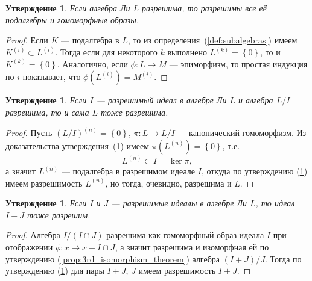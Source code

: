 \documentclass[a4paper, 12pt]{article}
\newtheorem{proposition}[theorem]{Утверждение}
\theoremstyle{definition}
\begin{document}
\begin{proposition}
    \label{prop:subalgebras_and_homorphisms_solvability}
    Если алгебра Ли \({ L }\) разрешима, то разрешимы все её подалгебры и гомоморфные образы.
\end{proposition}
\begin{proof}
    Если \({ K }\) --- подалгебра в \({ L }\), то из определения~(\ref{def:subalgebras}) имеем \({ K^{(i)} \subset L^{(i)} }\). Тогда если для некоторого \({ k }\) выполнено \({ L^{(k)} = \left\{ 0 \right\} }\), то и \({ K^{(k)} = \left\{ 0 \right\} }\). Аналогично, если \({ \phi : L \to  M }\) --- эпиморфизм, то простая индукция по \({ i }\) показывает, что \({ \phi(L^{(i)}) = M^{(i)}. }\)
\end{proof}

\begin{proposition}
    \label{prop:L/I_solvability}
    Если \({ I }\) --- разрешимый идеал в алгебре Ли \({ L }\) и алгебра \({ L / I }\) разрешима, то и сама \({ L }\) тоже разрешима.
\end{proposition}
\begin{proof}
    Пусть \({ (L / I)^{(n)} = \left\{ 0 \right\} }\), \({ \pi : L \to L / I }\) --- канонический гомоморфизм. Из доказательства утверждения~(\ref{prop:subalgebras_and_homorphisms_solvability}) имеем \({ \pi(L^{(n)}) = \left\{ 0 \right\} }\), т.е.
    \[
        L^{(n)} \subset I = \ker \pi,
    \]
    а значит \({ L^{(n)} }\) --- подалгебра в разрешимом идеале \({ I }\), откуда по утверждению (\ref{prop:subalgebras_and_homorphisms_solvability}) имеем разрешимость \({ L^{(n)} }\), но тогда, очевидно, разрешима и \({ L }\).
\end{proof}

\begin{proposition}
    Если \({ I }\) и \({ J }\) --- разрешимые идеалы в алгебре Ли \({ L }\), то идеал \({ I + J }\) тоже разрешим.
\end{proposition}
\begin{proof}
    Алгебра \({ I / (I \cap J) }\) разрешима как гомоморфный образ идеала \({ I }\) при отображении \({ \phi : x \mapsto x + I \cap J }\), а значит разрешима и изоморфная ей по утверждению (\ref{prop:3rd_isomorphism_theorem}) алгебра \({ (I + J) / J }\). Тогда по утверждению (\ref{prop:L/I_solvability}) для пары \({ I + J }\), \({ J }\) имеем разрешимость \({ I + J }\).
\end{proof}
\end{document}

